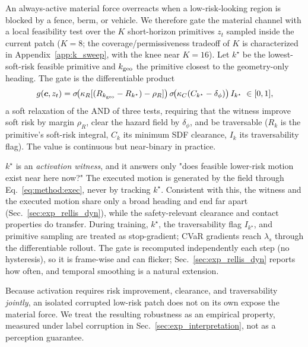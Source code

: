 An always-active material force overreacts when a low-risk-looking region is blocked by a fence, berm, or vehicle. We therefore gate the material channel with a local feasibility test over the $K$ short-horizon primitives $z_t$ sampled inside the current patch ($K{=}8$; the coverage/permissiveness tradeoff of $K$ is characterized in Appendix~\ref{app:k_sweep}, with the knee near $K{=}16$). Let $k^\star$ be the lowest-soft-risk feasible primitive and $k_{\rm geo}$ the primitive closest to the geometry-only heading. The gate is the differentiable product
\begin{equation}
g(\vec c,z_t)
=
\sigma\!\bigl(\kappa_R[(R_{k_{\rm geo}}-R_{k^\star})-\rho_R]\bigr)\,
\sigma\!\bigl(\kappa_C(C_{k^\star}-\delta_\phi)\bigr)\,
I_{k^\star}
\;\in[0,1],
\label{eq:method:gate}
\end{equation}
a soft relaxation of the AND of three tests, requiring that the witness improve soft risk by margin $\rho_R$, clear the hazard field by $\delta_\phi$, and be traversable ($R_k$ is the primitive's soft-risk integral, $C_k$ its minimum SDF clearance, $I_k$ its traversability flag). The value is continuous but near-binary in practice. 

$k^\star$ is an \emph{activation witness}, and it answers only "does feasible lower-risk motion exist near here now?" The executed motion is generated by the field through Eq.~\eqref{eq:method:exec}, never by tracking $k^\star$. Consistent with this, the witness and the executed motion share only a broad heading and end far apart (Sec.~\ref{sec:exp_rellis_dyn}), while the safety-relevant clearance and contact properties do transfer. During training, $k^\star$, the traversability flag $I_{k^\star}$, and primitive sampling are treated as stop-gradient; CVaR gradients reach $\lambda_s$ through the differentiable rollout. The gate is recomputed independently each step (no hysteresis), so it is frame-wise and can flicker; Sec.~\ref{sec:exp_rellis_dyn} reports how often, and temporal smoothing is a natural extension.

Because activation requires risk improvement, clearance, and traversability \emph{jointly}, an isolated corrupted low-risk patch does not on its own expose the material force. We treat the resulting robustness as an empirical property, measured under label corruption in Sec.~\ref{sec:exp_interpretation}, not as a perception guarantee.

